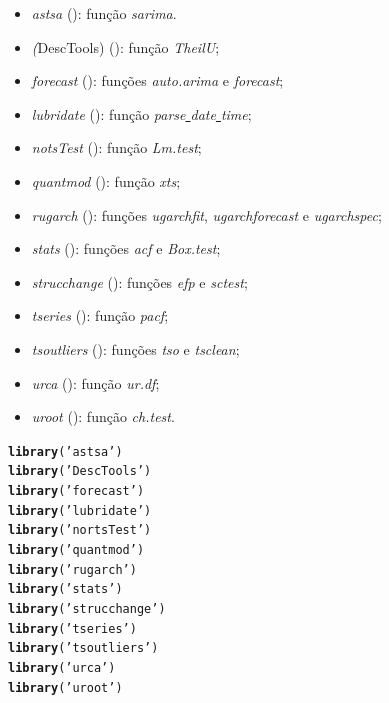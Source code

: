 \documentclass{article}\usepackage[]{graphicx}\usepackage[]{color}
\makeatletter
\newcommand{\hlstr}[1]{\textcolor[rgb]{0.192,0.494,0.8}{#1}}%
\newcommand{\hlstd}[1]{\textcolor[rgb]{0.345,0.345,0.345}{#1}}%
\newcommand{\hlkwd}[1]{\textcolor[rgb]{0.737,0.353,0.396}{\textbf{#1}}}%
\newenvironment{kframe}{%
 \def\at@end@of@kframe{}%
 \ifinner\ifhmode%
  \def\at@end@of@kframe{\end{minipage}}%
  \begin{minipage}{\columnwidth}%
 \fi\fi%
 \def\FrameCommand##1{\hskip\@totalleftmargin \hskip-\fboxsep
 \colorbox{shadecolor}{##1}\hskip-\fboxsep
     \hskip-\linewidth \hskip-\@totalleftmargin \hskip\columnwidth}%
 \MakeFramed {\advance\hsize-\width
   \@totalleftmargin\z@ \linewidth\hsize
   \@setminipage}}%
 {\par\unskip\endMakeFramed%
 \at@end@of@kframe}
\newenvironment{knitrout}{}{} %
\makeatother
\begin{document}
    \begin{itemize}
        \item \textit{astsa} (\cite{astsa}): função \textit{sarima}.
        \item \textit(DescTools) (\cite{desctools}): função \textit{TheilU};
        \item \textit{forecast} (\cite{forecast}): funções \textit{auto.arima} e \textit{forecast};
        \item \textit{lubridate} (\cite{lubridate}): função \textit{parse\underline{ }date\underline{ }time};
        \item \textit{notsTest} (\cite{nortstest}): função \textit{Lm.test};
        \item \textit{quantmod} (\cite{quantmod}): função \textit{xts};
        \item \textit{rugarch} (\cite{rugarch}): funções \textit{ugarchfit}, \textit{ugarchforecast} e \textit{ugarchspec};
        \item \textit{stats} (\cite{stats}): funções \textit{acf} e \textit{Box.test};
        \item \textit{strucchange} (\cite{strucchange}): funções \textit{efp} e \textit{sctest};
        \item \textit{tseries} (\cite{tseries}): função \textit{pacf};
        \item \textit{tsoutliers} (\cite{tsoutliers}): funções \textit{tso} e \textit{tsclean};
        \item \textit{urca} (\cite{urca}): função \textit{ur.df};
        \item \textit{uroot} (\cite{uroot}): função \textit{ch.test}.
    \end{itemize}
    
\begin{knitrout}
\color{fgcolor}\begin{kframe}
\begin{alltt}
\hlkwd{library}\hlstd{(}\hlstr{'astsa'}\hlstd{)}
\hlkwd{library}\hlstd{(}\hlstr{'DescTools'}\hlstd{)}
\hlkwd{library}\hlstd{(}\hlstr{'forecast'}\hlstd{)}
\hlkwd{library}\hlstd{(}\hlstr{'lubridate'}\hlstd{)}
\hlkwd{library}\hlstd{(}\hlstr{'nortsTest'}\hlstd{)}
\hlkwd{library}\hlstd{(}\hlstr{'quantmod'}\hlstd{)}
\hlkwd{library}\hlstd{(}\hlstr{'rugarch'}\hlstd{)}
\hlkwd{library}\hlstd{(}\hlstr{'stats'}\hlstd{)}
\hlkwd{library}\hlstd{(}\hlstr{'strucchange'}\hlstd{)}
\hlkwd{library}\hlstd{(}\hlstr{'tseries'}\hlstd{)}
\hlkwd{library}\hlstd{(}\hlstr{'tsoutliers'}\hlstd{)}
\hlkwd{library}\hlstd{(}\hlstr{'urca'}\hlstd{)}
\hlkwd{library}\hlstd{(}\hlstr{'uroot'}\hlstd{)}
\end{alltt}
\end{kframe}
\end{knitrout}
\end{document}
